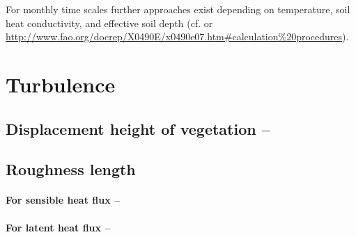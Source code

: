 For monthly time scales further approaches exist depending on temperature, soil heat conductivity, and effective soil depth (cf. \citet{Maidment1993} or \url{http://www.fao.org/docrep/X0490E/x0490e07.htm#calculation\%20procedures}).


\section{Turbulence}

\subsection{Displacement height of vegetation -- \heightDisplace} \label{sec:meteo:heightdispl}

\subsection{Roughness length} \label{sec:meteo:roughlen}

\paragraph{For sensible heat flux -- \roughLenSen}

\paragraph{For latent heat flux -- \roughLenLat}

